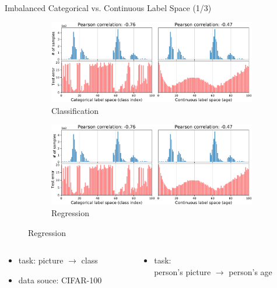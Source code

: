 \begin{frame}{Imbalanced Categorical vs. Continuous Label Space (1/3)}
	\begin{figure}[h]
		\begin{subfigure}{0.48\textwidth}
			\includegraphics[width=\linewidth]{images/err_motivate_1_left.pdf}
			\caption{Classification}
		\end{subfigure}\hspace{1em}%
		\begin{subfigure}{0.44\textwidth}
			\includegraphics[width=\linewidth]{images/err_motivate_1_right.pdf}
			\caption{Regression}
		\end{subfigure}
	\end{figure}
	\footnotesize
	\vspace{-1.5em}
	\begin{columns}
		\begin{column}{0.5\textwidth}
			\begin{itemize}
				\item task: picture $\longrightarrow$ class
				\item data souce: CIFAR-100
			\end{itemize}
		\end{column}
		\begin{column}{0.5\textwidth}
			\begin{itemize}
				\item task: \\person's picture $\longrightarrow$ person's age

\end{itemize}
\end{column}
\end{columns}
\end{frame}
